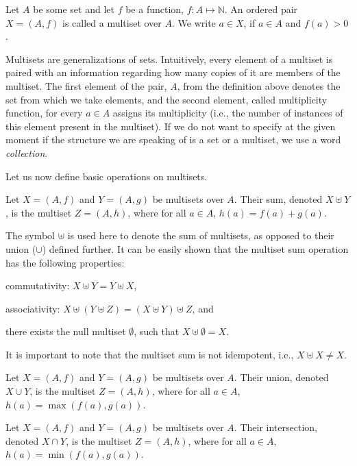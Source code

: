 \begin{definition}
    Let $A$ be some set and let $f$ be a function, $f\colon A\mapsto\mathbb{N}$.
	An ordered pair $X=(A,f)$ is called a multiset over $A$.
	We write $a\in X$, if $a\in A$ and $f(a)>0$.
\end{definition}

Multisets are generalizations of sets.
Intuitively, every element of a multiset is paired with an information regarding how many copies of it are members of the multiset.
The first element of the pair, $A$, from the definition above denotes the set from which we take elements, and the second element, called multiplicity function, for every $a\in A$ assigns its multiplicity (i.e., the number of instances of this element present in the multiset).
If we do not want to specify at the given moment if the structure we are speaking of is a set or a multiset, we use a word \emph{collection}.

Let us now define basic operations on multisets.

\begin{definition}
    Let $X=(A,f)$ and $Y=(A,g)$ be multisets over $A$.
	Their sum, denoted $X\uplus Y$, is the multiset $Z=(A,h)$, where for all $a\in A$, $h(a)=f(a)+g(a)$.
\end{definition}

The symbol $\uplus$ is used here to denote the sum of multisets, as opposed to their union ($\cup$) defined further.
It can be easily shown that the multiset sum operation has the following properties:
\begin{Enumerate}
    \item commutativity: $X\uplus Y=Y\uplus X$,
	\item associativity: $X\uplus(Y\uplus Z)=(X\uplus Y)\uplus Z$, and
	\item there exists the null multiset $\emptyset$, such that $X\uplus\emptyset=X$.
\end{Enumerate}
It is important to note that the multiset sum is not idempotent, i.e., $X\uplus X\ne X$.

\begin{definition}
    Let $X=(A,f)$ and $Y=(A,g)$ be multisets over $A$.
	Their union, denoted $X\cup Y$, is the multiset $Z=(A,h)$, where for all $a\in A$, $h(a)=\max(f(a),g(a))$.
\end{definition}

\begin{definition}
    Let $X=(A,f)$ and $Y=(A,g)$ be multisets over $A$.
	Their intersection, denoted $X\cap Y$, is the multiset $Z=(A,h)$, where for all $a\in A$, $h(a)=\min(f(a),g(a))$.
\end{definition}

